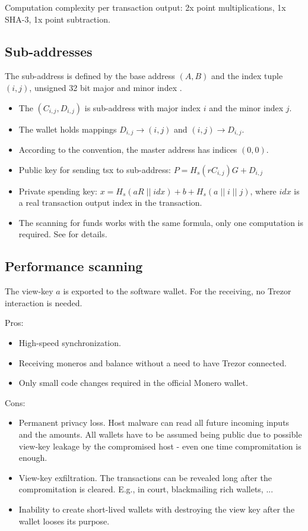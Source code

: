 \documentclass[]{article}
\begin{document}
Computation complexity per transaction output: 2x point multiplications, 1x SHA-3, 1x point subtraction.

\subsection{Sub-addresses}
The sub-address is defined by the base address $(A,B)$ and the index tuple $(i,j)$, unsigned 32 bit major and minor index \cite{mrl_006_subaddr}.

\begin{itemize}
	\item The $(C_{i,j}, D_{i,j})$ is sub-address with major index $i$ and the minor index $j$.
	
	\item  The wallet holds mappings $D_{i,j} \rightarrow (i, j)$ and $(i, j) \rightarrow D_{i,j}$. 
	
	\item According to the convention, the master address has indices $(0, 0)$.
	
	\item Public key for sending tsx to sub-address: $P = H_s(rC_{i,j})G + D_{i,j}$
	
	\item Private spending key: $x = H_s(aR \; || \; idx) + b + H_s(a \; || \; i \; || \; j)$, where $idx$ is a real transaction output index in the transaction.
	
	\item The scanning for funds works with the same formula, only one computation is required. See \cite{mrl_006_subaddr} for details.
\end{itemize}

\subsection{Performance scanning} 
The view-key $a$ is exported to the software wallet. For the receiving, no Trezor interaction is needed. 

\noindent Pros:
\begin{itemize}
	\item High-speed synchronization.
	\item Receiving moneros and balance without a need to have Trezor connected.
	\item Only small code changes required in the official Monero wallet.
\end{itemize}

\noindent Cons:
\begin{itemize}
	\item Permanent privacy loss. Host malware can read all future incoming inputs and the amounts. All wallets have to be assumed being public due to possible view-key leakage by the compromised host - even one time compromitation is enough.
	\item View-key exfiltration. The transactions can be revealed long after the compromitation is cleared. E.g., in court, blackmailing rich wallets, ...
	\item Inability to create short-lived wallets with destroying the view key after the wallet looses its purpose. 
\end{itemize}
\end{document}

